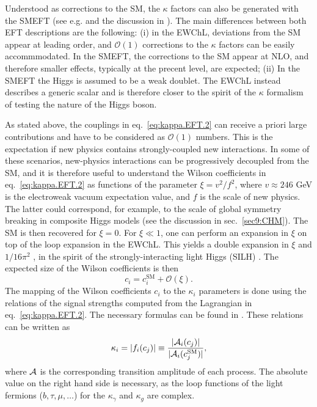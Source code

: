 Understood as corrections to the SM, the $\kappa$ factors can also be generated with the SMEFT (see e.g.\cite{Ghezzi:2015vva} and the discussion in \cite{Brivio:2017vri}). The main differences between both EFT descriptions are the following: (i) in the EWChL, deviations from the SM appear at leading order, and $\mathcal{O}(1)$ corrections to the $\kappa$ factors can be easily accommmodated. In the SMEFT, the corrections to the SM appear at NLO, and therefore smaller effects, typically at the precent level, are expected; (ii) In the SMEFT the Higgs is assumed to be a weak doublet. The EWChL instead describes a generic scalar and is therefore closer to the spirit of the $\kappa$ formalism of testing the nature of the Higgs boson.
 
As stated above, the couplings in eq.~\eqref{eq:kappa.EFT.2} can receive a priori large contributions and have to be considered as $\mathcal{O}(1)$ numbers. This is the expectation if new physics contains strongly-coupled new interactions. In some of these scenarios, new-physics interactions can be progressively decoupled from the SM, and it is therefore useful to understand the Wilson coefficients in eq.~\eqref{eq:kappa.EFT.2} as functions of the parameter $\xi = v^{2}/f^{2}$, where $v\approx 246$ GeV is the electroweak vacuum expectation value, and $f$ is the scale of new physics. The latter could correspond, for example, to the scale of global symmetry breaking in composite Higgs models (see the discussion in sec.~\ref{sec9:CHM}). The SM is then recovered for $\xi=0$. For $\xi\ll 1$, one can perform an expansion in $\xi$ on top of the loop expansion in the EWChL. This yields a double expansion in $\xi$ and $1/16\pi^{2}$ \cite{Buchalla:2014eca}, in the spirit of the strongly-interacting light Higgs (SILH) \cite{Giudice:2007fh}. The expected size of the Wilson coefficients is then
\begin{equation}
  \label{eq:kappa.EFT.4}
    c_{i} =  c_{i}^{\text{SM}} + \mathcal{O}(\xi).
\end{equation}
The mapping of the Wilson coefficients $c_{i}$ to the $\kappa_{i}$ parameters is done using the relations of the signal strengths computed from the Lagrangian in eq.~\eqref{eq:kappa.EFT.2}. The necessary formulas can be found in \cite{Buchalla:2015qju,deBlas:2018tjm}. These relations can be written as
%
\begin{equation}
\label{eq:kappa.EFT.5}
  \kappa_{i} =  |f_i(c_{j})| \equiv \frac{|{\cal A}_i(c_{j})|}{|{\cal A}_i(c_{j}^{\text{SM}})|}, 
\end{equation}
%
where ${\cal A}$ is the corresponding transition amplitude of each process. 
The absolute value on the right hand side is necessary, as the loop functions of the light fermions ($b,\tau,\mu,\dots$) for the $\kappa_{\gamma}$ and $\kappa_{g}$ are complex.

